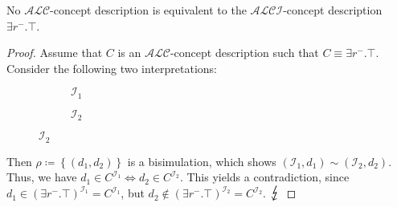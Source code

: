 \begin{prop}
	No $\mathcal{ALC}$-concept description is equivalent to the $\mathcal{ALCI}$-concept description $\exists r^{-}.\top$.
\end{prop}
\begin{proof}
	Assume that $C$ is an $\mathcal{ALC}$-concept description such that $C \equiv \exists r^{-}.\top$.
	Consider the following two interpretations:
	\begin{figure}[H]
		\centering
		\begin{subfigure}[t]{.475\textwidth}
			\centering
			\caption{$\mathcal{I}_1$}
		\end{subfigure}
		\hfill
		\begin{subfigure}[t]{.475\textwidth}
			\centering
			\caption{$\mathcal{I}_2$}
		\end{subfigure}
	\end{figure}
	Then $\rho \coloneqq \left\{ (d_1,d_2) \right\}$ is a bisimulation, which shows $\left(  \mathcal{I}_1, d_1 \right) \sim \left( \mathcal{I}_2,d_2 \right)$.
	Thus, we have  $d_1 \in C^{\mathcal{I}_1} \iff d_2 \in C^{\mathcal{I}_2}$.
	This yields a contradiction, since $d_1 \in \left( \exists r^{-}.\top \right)^{\mathcal{I}_1} = C^{\mathcal{I}_1}$, but
	$d_2 \notin \left( \exists r^{-}.\top \right)^{\mathcal{I}_2} = C^{\mathcal{I}_2}$. $\contra$
\end{proof}

